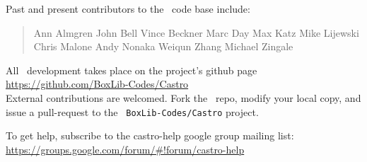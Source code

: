 Past and present contributors to the \castro\ code base include:

\begin{quote}
Ann Almgren\newline
John Bell\newline
Vince Beckner\newline
Marc Day\newline
Max Katz\newline
Mike Lijewski\newline
Chris Malone\newline
Andy Nonaka\newline
Weiqun Zhang\newline
Michael Zingale
\end{quote}

All \castro\ development takes place on the project's github page\\[0.5em]
\url{https://github.com/BoxLib-Codes/Castro}\\[0.5em]
External contributions are welcomed.  Fork the \castro\ repo, modify
your local copy, and issue a pull-request to the {\tt
BoxLib-Codes/Castro} project.

To get help, subscribe to the castro-help google group mailing list:
\url{https://groups.google.com/forum/#!forum/castro-help}

